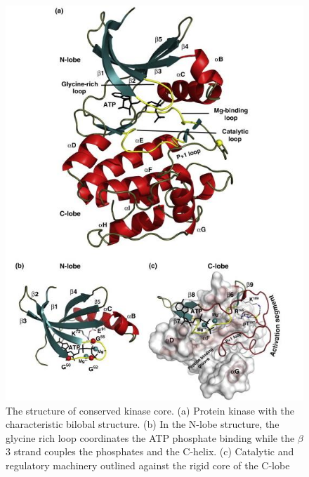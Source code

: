 \documentclass[a4paper, 11pt]{report}
\begin{document}
\begin{figure}[H]
	\includegraphics[width=.7\linewidth]{figures/proteinkinase.jpg}
	\centering
	\caption{The structure of conserved kinase core. (a) Protein kinase with the characteristic bilobal structure. (b) In the N-lobe structure, the glycine rich loop coordinates the ATP phosphate binding while the $\beta$3 strand couples the phosphates and the C-helix. (c) Catalytic and regulatory machinery outlined against the rigid core of the C-lobe \cite{taylor2011protein}}
	\label{kinasestructure}
\end{figure}
\end{document}
